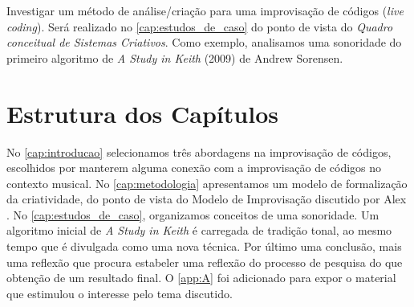 Investigar um método de análise/criação para uma improvisação de códigos (\emph{live coding}). Será realizado no \autoref{cap:estudos_de_caso} do ponto de vista do \emph{Quadro conceitual de Sistemas Criativos}. Como exemplo, analisamos uma sonoridade do primeiro algoritmo de \emph{A Study in Keith} (2009) de Andrew Sorensen.

\section*{Estrutura dos Capítulos}

No \autoref{cap:introducao} selecionamos três abordagens na improvisação de códigos, escolhidos por manterem alguma conexão com a improvisação de códigos no contexto musical.  No \autoref{cap:metodologia} apresentamos um modelo de formalização da criatividade, do ponto de vista do Modelo de Improvisação discutido por Alex . No \autoref{cap:estudos_de_caso}, organizamos conceitos de uma sonoridade. Um algoritmo inicial de \emph{A Study in Keith} é carregada de tradição tonal, ao mesmo tempo que é divulgada como uma nova técnica. Por último uma conclusão, mais uma reflexão que procura estabeler uma reflexão do processo de pesquisa do que obtenção de um resultado final. O \autoref{app:A} foi adicionado para expor o material que estimulou o interesse pelo tema discutido.